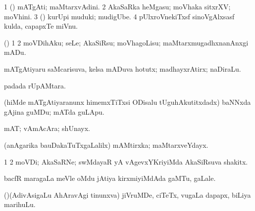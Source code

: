 {{{{{{\bentry
{} 
\gl{\nA}
\expl{}
\bmng
\bnum
\num{1} (\kanmu) mATgAti; maMtarxvAdini. 
\num{2} AkaSaRka heMgasu; moVhaka sitxrXV; moVhini. 
\num{3} (\rUpa) kurUpi muduki; mudigUbe. 
\num{4} pUlxroVnekiTxsf sinoVgAlxsasf kulda, capapxTe miVnu. 
\enum
\emng
\eentry

\bentry
{} 
\gl{\sakirx}
\bmng
(\pArxparx) 
\bnum
\num{1}  
\num{2} moVDihAku; seLe; AkaSiRsu; moVhagoLisu; maMtarxmugadhxnanAnxgi mADu. 
\enum
\emng

\noindent
\gl{\pagu}
\expl{}
\bmng
{} mATgAtiyaru saMcarisuva, kelsa mADuva hotutx; madhayxrAtirx; naDiraLu. 
\emng
\eentry

\bentry
{} 
\gl{\sapUpa}
\expl{}
\bmng
{} padada rUpAMtara. 
\emng
\eentry

\bentry
{} 
\gl{\nA}
\expl{}
\bmng
(hiMde mATgAtiyaranunx himemxTiTxsi ODisalu tUguhAkutitxdadx) baNNxda gAjina guMDu; mATda guLApu. 
\emng
\eentry

\bentry
{} 
\gl{\nA}
\expl{}
\bmng
mAT; vAmAcAra; shUnayx. 
\emng
\eentry

\bentry
{} 
\gl{\nA}
\expl{}
\bmng
(anAgarika bauDakaTuTxgaLalilx) mAMtirxka; maMtarxveYdayx. 
\emng
\eentry

\bentry
{} 
\gl{\nA}
\expl{}
\bmng
\bnum
\num{1}  
\num{2} moVDi; AkaSaRNe; swMdayaR yA vAgevxYKriyiMda AkaSiRsuva shakitx. 
\enum
\emng
\eentry

\bentry
{} 
\gl{\nA}
\expl{}
\bmng
bacfR maragaLa meVle oMdu jAtiya kirxmiyiMdAda gaMTu, gaLale. 
\emng
\eentry

\bentry
{} 
\gl{\nA}
\expl{}
\bmng
{} 
\emng
\eentry

\bentry
{} 
\gl{\nA}
\bmng
(\AseTxrXV)(AdivAsigaLu AhAravAgi tinunxva) jiVruMDe, ciTeTx, \mo vugaLa dapapx, biLiya marihuLu. 
\emng
\eentry

\bentry
{} 
\gl{\nA}
\expl{}
\bmng
{} 
\emng
\eentry

}}}}}}
